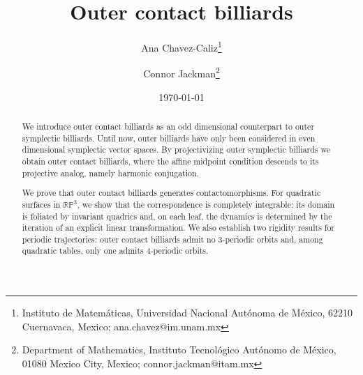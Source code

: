 \documentclass{article}
\title{Outer contact billiards}
\author{Ana Chavez-Caliz\footnote{
Instituto de Matem\'aticas, 
Universidad Nacional Aut\'onoma de M\'exico,
62210 Cuernavaca, 
Mexico; 
ana.chavez@im.unam.mx} 
\and 
Connor Jackman\footnote{
Department of Mathematics, 
Instituto Tecnol\'ogico Aut\'onomo de M\'exico, 
01080 Mexico City,
Mexico; 
connor.jackman@itam.mx}}
\date{\today}
\begin{document}
\maketitle
\begin{abstract}
    We introduce outer contact billiards as an odd dimensional counterpart to outer symplectic billiards. %
    Until now, outer billiards have only been considered in even dimensional symplectic vector spaces. By projectivizing outer symplectic billiards we obtain outer contact billiards, where the affine midpoint condition descends to its projective analog, namely harmonic conjugation. %

   We prove that outer contact billiards generates contactomorphisms.  %
    For quadratic surfaces in $\mathbb{RP}^3$, we show that the 
    correspondence is completely integrable: its domain is foliated by invariant quadrics 
    and, on each leaf, the dynamics is determined by the iteration of an explicit linear 
    transformation. We also establish two rigidity results for periodic trajectories: 
    outer contact billiards admit no $3$-periodic orbits and, among quadratic tables, only 
    one admits $4$-periodic orbits.
    
\end{abstract}
\end{document}
